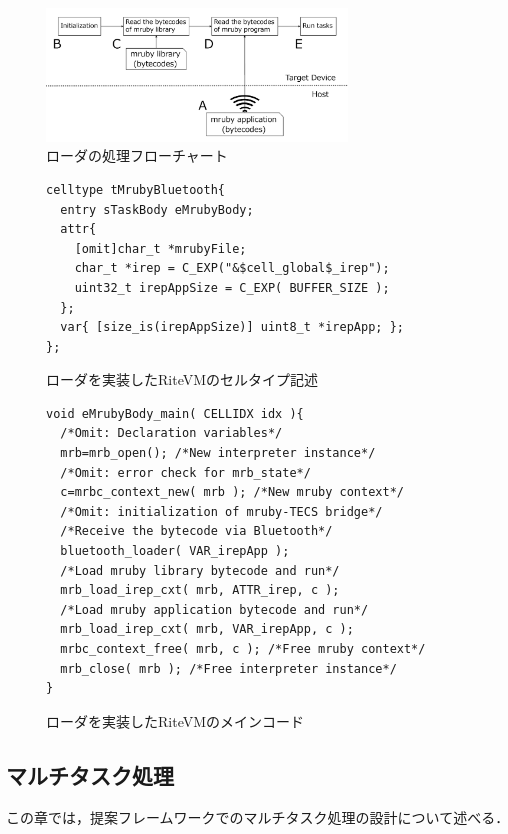 \documentclass[submit,techrep]{ipsj}
\begin{document}
\begin{figure}[t]
    \centering
    \includegraphics[width=8cm,clip]{../EMSOFT2016/figure/control_flow.pdf}
    \caption{ローダの処理フローチャート}
\vspace{-2mm}
    \label{fig:control_flow}
\end{figure}
\begin{figure}[t]
\centering
\begin{lstlisting}
celltype tMrubyBluetooth{
  entry sTaskBody eMrubyBody;
  attr{
    [omit]char_t *mrubyFile;
    char_t *irep = C_EXP("&$cell_global$_irep");
    uint32_t irepAppSize = C_EXP( BUFFER_SIZE );
  };
  var{ [size_is(irepAppSize)] uint8_t *irepApp; };
};
\end{lstlisting}
\caption{ローダを実装したRiteVMのセルタイプ記述}
\label{celltype_mrubybluetooth}
\end{figure}
\begin{figure}[t]
\centering
\begin{lstlisting}
void eMrubyBody_main( CELLIDX idx ){
  /*Omit: Declaration variables*/
  mrb=mrb_open(); /*New interpreter instance*/
  /*Omit: error check for mrb_state*/
  c=mrbc_context_new( mrb ); /*New mruby context*/
  /*Omit: initialization of mruby-TECS bridge*/
  /*Receive the bytecode via Bluetooth*/
  bluetooth_loader( VAR_irepApp );
  /*Load mruby library bytecode and run*/
  mrb_load_irep_cxt( mrb, ATTR_irep, c );
  /*Load mruby application bytecode and run*/
  mrb_load_irep_cxt( mrb, VAR_irepApp, c );
  mrbc_context_free( mrb, c ); /*Free mruby context*/
  mrb_close( mrb ); /*Free interpreter instance*/
}

\end{lstlisting}
\caption{ローダを実装したRiteVMのメインコード}
\vspace{-2mm}
\label{maincode_mrubybluetooth}
\end{figure}
\subsection{マルチタスク処理}
\label{sec:Multitask}
この章では，提案フレームワークでのマルチタスク処理の設計について述べる．
\end{document}
